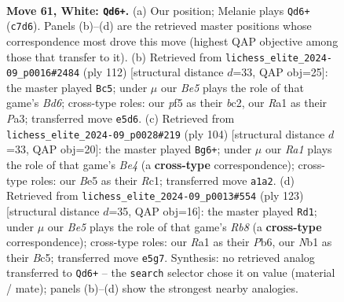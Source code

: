 \documentclass[11pt]{article}
\begin{document}
\clearpage

\begin{figure}[p]\centering
\begin{subfigure}{0.46\textwidth}\centering
\resizebox{\linewidth}{!}{%
\newchessgame
\chessboard[
  setfen={8/2Q5/k7/p2pBp2/P6r/8/8/RN4K1 w - - 2 61},
  showmover=false,
  pgfstyle=straightmove, color=movearrow, markmove={c7-d6}
]}
\caption{}
\end{subfigure}\hfill
\begin{subfigure}{0.46\textwidth}\centering
\resizebox{\linewidth}{!}{%
\newchessgame
\chessboard[
  setfen={8/5k2/R2B1p2/3p4/p2P3r/P7/2b5/4K3 w - - 8 57},
  showmover=false,
  pgfstyle=straightmove, color=movearrow, markmove={d6-c5}
]}
\caption{}
\end{subfigure}
\\[4pt]
\begin{subfigure}{0.46\textwidth}\centering
\resizebox{\linewidth}{!}{%
\newchessgame
\chessboard[
  setfen={4k2r/p1Q5/1p6/6p1/P3B3/8/8/2R3K1 w - - 1 53},
  showmover=false,
  pgfstyle=straightmove, color=movearrow, markmove={e4-g6}
]}
\caption{}
\end{subfigure}\hfill
\begin{subfigure}{0.46\textwidth}\centering
\resizebox{\linewidth}{!}{%
\newchessgame
\chessboard[
  setfen={8/8/1p6/p1b5/P1P2Pk1/2K5/8/1r3q2 b - - 1 62},
  showmover=false,
  pgfstyle=straightmove, color=movearrow, markmove={b1-d1}
]}
\caption{}
\end{subfigure}
\caption{\textbf{Move 61, White: \texttt{Qd6+}.} (a) Our position; Melanie plays \texttt{Qd6+} (\texttt{c7d6}). Panels (b)--(d) are the retrieved master positions whose correspondence most drove this move (highest QAP objective among those that transfer to it). (b) Retrieved from \texttt{lichess\_elite\_2024-09\_p0016\#2484} (ply 112) [structural distance $d$=33, QAP obj=25]: the master played \texttt{Bc5}; under $\mu$ our \emph{Be5} plays the role of that game's \emph{Bd6}; cross-type roles: our \emph{p}f5 as their \emph{b}c2, our \emph{R}a1 as their \emph{P}a3; transferred move \texttt{e5d6}. (c) Retrieved from \texttt{lichess\_elite\_2024-09\_p0028\#219} (ply 104) [structural distance $d$=33, QAP obj=20]: the master played \texttt{Bg6+}; under $\mu$ our \emph{Ra1} plays the role of that game's \emph{Be4} (a \textbf{cross-type} correspondence); cross-type roles: our \emph{B}e5 as their \emph{R}c1; transferred move \texttt{a1a2}. (d) Retrieved from \texttt{lichess\_elite\_2024-09\_p0013\#554} (ply 123) [structural distance $d$=35, QAP obj=16]: the master played \texttt{Rd1}; under $\mu$ our \emph{Be5} plays the role of that game's \emph{Rb8} (a \textbf{cross-type} correspondence); cross-type roles: our \emph{R}a1 as their \emph{P}b6, our \emph{N}b1 as their \emph{B}c5; transferred move \texttt{e5g7}. Synthesis: no retrieved analog transferred to \texttt{Qd6+} -- the \texttt{search} selector chose it on value (material / mate); panels (b)--(d) show the strongest nearby analogies.}
\label{fig:thought-m120}
\end{figure}
\end{document}
